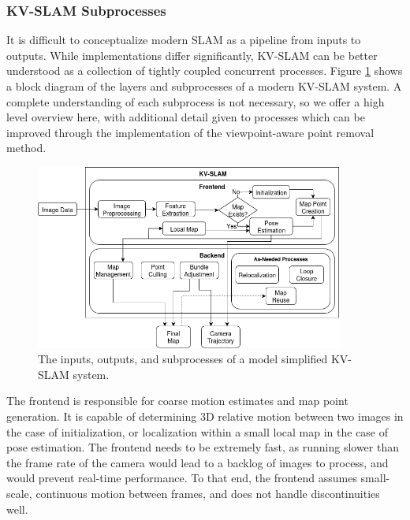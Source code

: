 \subsubsection{}

\subsubsection{KV-SLAM Subprocesses}

It is difficult to conceptualize modern SLAM as a pipeline from inputs to outputs. While implementations differ significantly, KV-SLAM can be better understood as a collection of tightly coupled concurrent processes. Figure \ref{fig:subprocesses} shows a block diagram of the layers and subprocesses of a modern KV-SLAM system. A complete understanding of each subprocess is not necessary, so we offer a high level overview here, with additional detail given to processes which can be improved through the implementation of the viewpoint-aware point removal method.

\begin{figure}[!ht]
    \centering
    \includegraphics[width=0.9\textwidth]{resources/subprocesses.png}
    \caption[KV-SLAM Subprocesses]{The inputs, outputs, and subprocesses of a model simplified KV-SLAM system.}
    \label{fig:subprocesses}
\end{figure}

The frontend is responsible for coarse motion estimates and map point generation. It is capable of determining 3D relative motion between two images in the case of initialization, or localization within a small local map in the case of pose estimation. The frontend needs to be extremely fast, as running slower than the frame rate of the camera would lead to a backlog of images to process, and would prevent real-time performance. To that end, the frontend assumes small-scale, continuous motion between frames, and does not handle discontinuities well.

